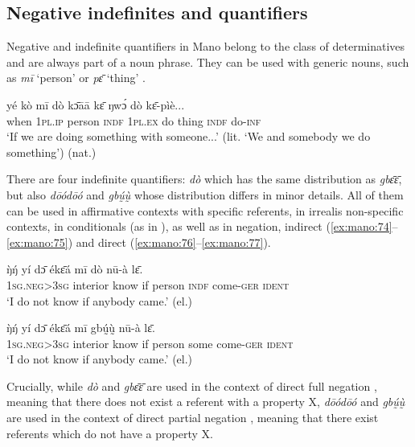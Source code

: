 \documentclass[output=paper,colorlinks,citecolor=brown]{langscibook}
\begin{document}
\subsection{Negative indefinites and quantifiers}\label{sec:mano:3.2}
Negative and indefinite quantifiers in Mano belong to the class of determinatives and are always part of a noun phrase. They can be used with generic nouns, such as \textit{mī} ‘person’ or \textit{pɛ̄ } ‘thing’ .

\ea\label{ex:mano:73}
    \gll yé kò mī dò kɔ̄āā kɛ̄ ŋwɔ́ dò kɛ̄-pìè... \\
         when 1\textsc{pl.ip} person \textsc{indf} \textsc{1pl.ex} do thing \textsc{indf} do-\textsc{inf}       \\
    \glt ‘If we are doing something with someone...’ (lit. ‘We and somebody we do something’) (nat.)
\z

There are four indefinite quantifiers: \textit{dò}%
which has the same distribution as \textit{gbɛ̄ɛ̄}, but also \textit{dōódōó} and \textit{gbṵ́ṵ̀} whose distribution differs in minor details. All of them can be used in affirmative contexts with specific referents, in irrealis non-specific contexts, in conditionals (as in ), as well as in negation, indirect (\ref{ex:mano:74}--\ref{ex:mano:75}) and direct (\ref{ex:mano:76}--\ref{ex:mano:77}).

\ea\label{ex:mano:74}
    \gll ŋ̀ŋ́ yí dɔ̄ ékɛ̄á mī dò nū-à lɛ̄. \\
         \textsc{1sg.neg>3sg} interior know if person \textsc{indf} come-\textsc{ger} \textsc{ident}\\
    \glt \textsc{‘}I do not know if anybody came.’ (el.)
\z

\ea\label{ex:mano:75}
    \gll ŋ̀ŋ́ yí dɔ̄ ékɛ̄á mī gbṵ́ṵ̀ nū-à lɛ̄. \\
         \textsc{1sg.neg>3sg} interior know if person some come-\textsc{ger} \textsc{ident}\\
    \glt \textsc{‘}I do not know if anybody came.’ (el.)
\z

Crucially, while \textit{dò} and \textit{gbɛ̄ɛ̄} are used in the context of direct full negation , meaning that there does not exist a referent with a property X, \textit{dōódōó} and \textit{gbṵ́ṵ̀} are used in the context of direct partial negation , meaning that there exist referents which do not have a property X.
\end{document}
